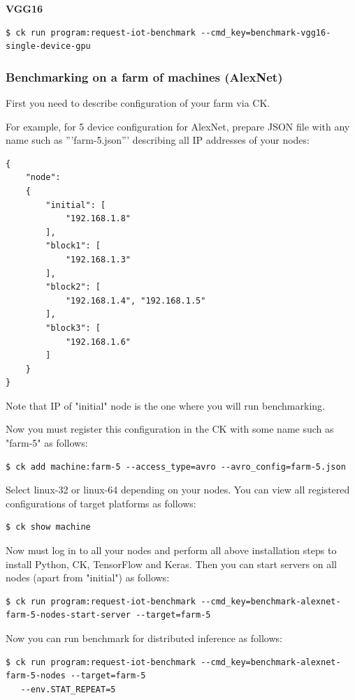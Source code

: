 \documentclass[sigplan]{acmart}
\begin{document}
\textbf{VGG16}

\begin{verbatim}
$ ck run program:request-iot-benchmark --cmd_key=benchmark-vgg16-single-device-gpu
\end{verbatim}

\subsubsection{Benchmarking on a farm of machines (AlexNet)}

First you need to describe configuration of your farm via CK. 

For example, for 5 device configuration for AlexNet,
prepare JSON file with any name such as '''farm-5.json''' 
describing all IP addresses of your nodes:

\begin{verbatim}
{
    "node":
    {
        "initial": [
            "192.168.1.8"
        ],
        "block1": [
            "192.168.1.3"
        ],
        "block2": [
            "192.168.1.4", "192.168.1.5"
        ],
        "block3": [
            "192.168.1.6"
        ]
    }
}
\end{verbatim}

Note that IP of "initial" node is the one where you will run benchmarking.

Now you must register this configuration in the CK with some name such as "farm-5" as follows:
\begin{verbatim}
$ ck add machine:farm-5 --access_type=avro --avro_config=farm-5.json
\end{verbatim}

Select linux-32 or linux-64 depending on your nodes. 
You can view all registered configurations of target platforms as follows:
\begin{verbatim}
$ ck show machine
\end{verbatim}

Now must log in to all your nodes and perform all above installation steps
to install Python, CK, TensorFlow and Keras. Then you can start servers
on all nodes (apart from "initial") as follows:

\begin{verbatim}
$ ck run program:request-iot-benchmark --cmd_key=benchmark-alexnet-farm-5-nodes-start-server --target=farm-5 
\end{verbatim}
Now you can run benchmark for distributed inference as follows:
\begin{verbatim}
$ ck run program:request-iot-benchmark --cmd_key=benchmark-alexnet-farm-5-nodes --target=farm-5
   --env.STAT_REPEAT=5
\end{verbatim}
\end{document}
